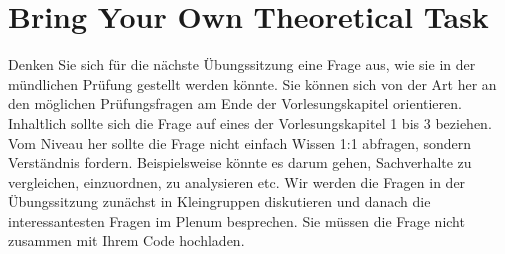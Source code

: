 \documentclass[headinclude,headsepline]{scrartcl}
\begin{document}
\section{Bring Your Own Theoretical Task}

Denken Sie sich für die nächste Übungssitzung eine Frage aus, wie sie in der mündlichen Prüfung gestellt werden könnte.
Sie können sich von der Art her an den möglichen Prüfungs\-fragen am Ende der Vorlesungskapitel orientieren.
Inhaltlich sollte sich die Frage auf eines der Vorlesungskapitel 1 bis 3 beziehen.
Vom Niveau her sollte die Frage nicht einfach Wissen 1:1 abfragen, sondern Verständnis fordern.
Beispielsweise könnte es darum gehen, Sachverhalte zu vergleichen, einzuordnen, zu analysieren etc.
Wir werden die Fragen in der Übungssitzung zunächst in Kleingruppen diskutieren und danach die interessantesten Fragen im Plenum besprechen.
Sie müssen die Frage nicht zusammen mit Ihrem Code hochladen.
\end{document}
